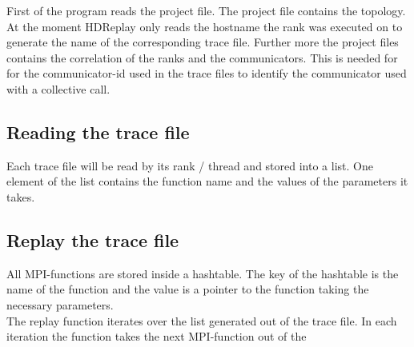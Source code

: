 \documentclass[10pt,a4paper]{scrartcl}
\begin{document}
\begin{small}
First of the program reads the project file. The project file contains the
topology. At the moment HDReplay only reads the hostname the rank was executed
on to generate the name of the corresponding trace file. Further more the
project files contains the correlation of the ranks and the communicators. This
is needed for for the communicator-id used in the trace files to identify the 
communicator used with a collective call. 

\subsection{Reading the trace file}

Each trace file will be read by its rank / thread and stored into a list.
One element of the list contains the function name and the values of the 
parameters it takes. 

\subsection{Replay the trace file}

All MPI-functions are stored inside a hashtable. The key of the hashtable is the
name of the function and the value is a pointer to the function taking the
necessary parameters.\\
The replay function iterates over the list generated out of the trace file. In
each iteration the function takes the next MPI-function out of the  

\end{small}
\end{document}
